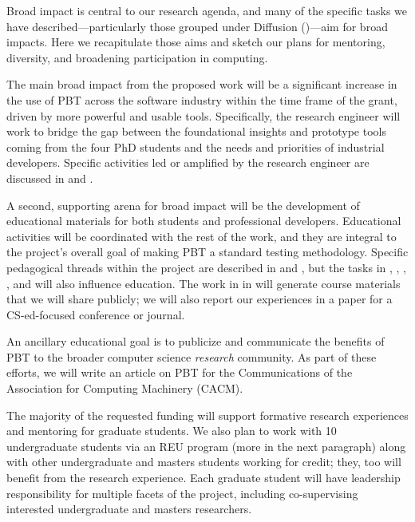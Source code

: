 
Broad impact is central to our research agenda, and many of the specific
tasks we have described---particularly those grouped under Diffusion
()---aim for broad impacts.  Here we
recapitulate those aims and sketch our plans for mentoring, diversity,
and broadening participation in computing.

\smallskip
{} The main broad impact from the
proposed work will be a significant increase in the use of PBT across
the software industry within the time frame of the grant, driven
by more powerful and usable tools. Specifically, the research engineer will work to
bridge the gap between the foundational insights and prototype tools
coming from the four PhD students and the needs and priorities of
industrial developers.
Specific activities led or amplified by the research engineer are discussed in
 and .

\smallskip
{}
%
A second, supporting arena for broad impact will be the
development of educational materials for both students and
professional developers. Educational activities will be
coordinated with the rest of the work, and they are integral to the
project's overall goal of making PBT a standard testing methodology.
Specific pedagogical
threads within the project are described in  and , but the
tasks in , ,
, , and
 will also influence education. The
work in  in will generate course materials that we will
share publicly; we will also report our experiences in a paper for a
CS-ed-focused conference or journal.

An ancillary educational goal is to
publicize and communicate the benefits of PBT to the broader computer science
{\em research} community. As part of these efforts, we will write an article on PBT
for the Communications of the Association for Computing Machinery
(CACM).

\smallskip
{}
%
The majority of the requested funding will support formative research
experiences and mentoring for graduate students. We
also plan to work with 10 undergraduate students via an
REU program (more in the next paragraph) along with other
undergraduate and masters
students working for credit;
they, too will benefit from the research experience. Each graduate
student will have leadership responsibility for multiple facets of the
project, including co-supervising interested undergraduate and masters
researchers.

